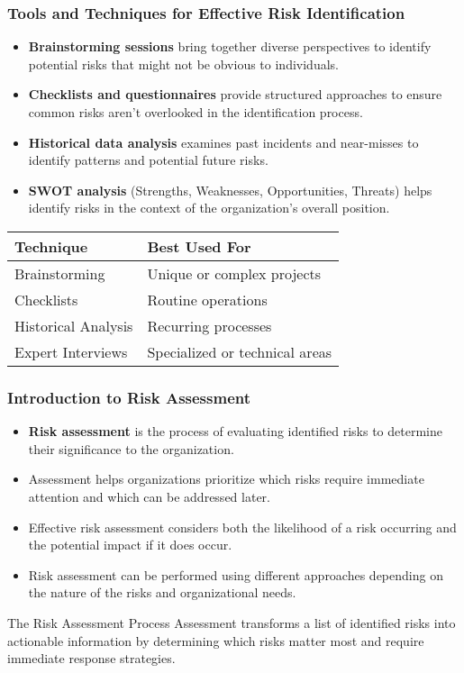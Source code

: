 \documentclass{beamer}
\begin{document}
\begin{frame}
    \frametitle{Tools and Techniques for Effective Risk Identification}
    \begin{itemize}
      \item \textbf{Brainstorming sessions} bring together diverse perspectives to identify potential risks that might not be obvious to individuals.
      \item \textbf{Checklists and questionnaires} provide structured approaches to ensure common risks aren't overlooked in the identification process.
      \item \textbf{Historical data analysis} examines past incidents and near-misses to identify patterns and potential future risks.
      \item \textbf{SWOT analysis} (Strengths, Weaknesses, Opportunities, Threats) helps identify risks in the context of the organization's overall position.
    \end{itemize}
    
    \begin{table}
    \centering
    \begin{tabular}{ll}
    \toprule
    \textbf{Technique} & \textbf{Best Used For} \\
    \midrule
    Brainstorming & Unique or complex projects \\
    Checklists & Routine operations \\
    Historical Analysis & Recurring processes \\
    Expert Interviews & Specialized or technical areas \\
    \bottomrule
    \end{tabular}
    \end{table}
    \end{frame}
    
    \begin{frame}
    \frametitle{Introduction to Risk Assessment}
    \begin{itemize}
      \item \textbf{Risk assessment} is the process of evaluating identified risks to determine their significance to the organization.
      \item Assessment helps organizations prioritize which risks require immediate attention and which can be addressed later.
      \item Effective risk assessment considers both the likelihood of a risk occurring and the potential impact if it does occur.
      \item Risk assessment can be performed using different approaches depending on the nature of the risks and organizational needs.
    \end{itemize}
    
    \begin{block}{The Risk Assessment Process}
    Assessment transforms a list of identified risks into actionable information by determining which risks matter most and require immediate response strategies.
    \end{block}
    \end{frame}
    
\end{document}
